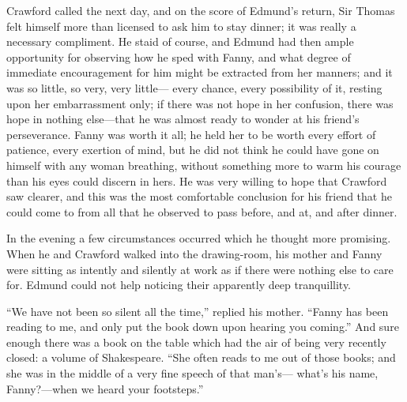 Crawford called the next day, and on the score of Edmund's
return, Sir Thomas felt himself more than licensed to ask
him to stay dinner; it was really a necessary compliment.
He staid of course, and Edmund had then ample opportunity
for observing how he sped with Fanny, and what degree
of immediate encouragement for him might be extracted from
her manners; and it was so little, so very, very little---%
every chance, every possibility of it, resting upon her
embarrassment only; if there was not hope in her confusion,
there was hope in nothing else---that he was almost ready
to wonder at his friend's perseverance.  Fanny was worth
it all; he held her to be worth every effort of patience,
every exertion of mind, but he did not think he could have
gone on himself with any woman breathing, without something
more to warm his courage than his eyes could discern in hers.
He was very willing to hope that Crawford saw clearer,
and this was the most comfortable conclusion for his
friend that he could come to from all that he observed
to pass before, and at, and after dinner.

In the evening a few circumstances occurred which he thought
more promising.  When he and Crawford walked into the
drawing-room, his mother and Fanny were sitting as intently
and silently at work as if there were nothing else to care for.
Edmund could not help noticing their apparently deep tranquillity.

``We have not been so silent all the time,'' replied his mother.
``Fanny has been reading to me, and only put the book
down upon hearing you coming.''  And sure enough there
was a book on the table which had the air of being
very recently closed:  a volume of Shakespeare.
``She often reads to me out of those books; and she
was in the middle of a very fine speech of that man's---%
what's his name, Fanny?---when we heard your footsteps.''

